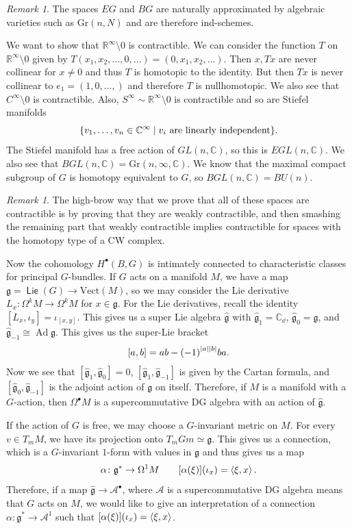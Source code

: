 \documentclass[leqno, openany]{memoir}
\theoremstyle{definition}
\theoremstyle{remark}
\newtheorem{rmk}[thm]{Remark}
\theoremstyle{plain}
\theoremstyle{definition}
\theoremstyle{remark}
\newcommand{\R}{\mathbb{R}}
\newcommand{\C}{\mathbb{C}}
\newcommand{\mc}[1]{\mathcal{#1}}
\newcommand{\mf}[1]{\mathfrak{#1}}
\newcommand{\mr}[1]{\mathrm{#1}}
\newcommand{\wh}[1]{\widehat{#1}}
\DeclareMathOperator{\Ad}{Ad}
\DeclareMathOperator{\Lie}{\mathsf{Lie}}
\begin{document}
\begin{rmk}
    The spaces $EG$ and $BG$ are naturally approximated by algebraic varieties such as $\mr{Gr}(n, N)$ and are therefore ind-schemes.
\end{rmk}

We want to show that $\R^{\infty} \setminus 0$ is contractible. We can consider the function $T$ on $\R^{\infty} \setminus 0$ given by $T(x_1, x_2, \ldots, 0, \ldots) = (0, x_1, x_2, \ldots)$. Then $x, Tx$ are never collinear for $x \neq 0$ and thus $T$ is homotopic to the identity. But then $Tx$ is never collinear to $e_1 = (1, 0, \ldots,)$ and therefore $T$ is nullhomotopic. We also see that $C^{\infty} \setminus 0$ is contractible. Also, $S^{\infty} \sim \R^{\infty} \setminus 0$ is contractible and so are Stiefel manifolds
\[ \qty{v_1, \ldots, v_n \in \C^{\infty} \mid v_i\ \text{are linearly independent}}. \]
The Stiefel manifold has a free action of $GL(n, \C)$, so this is $EGL(n, \C)$. We also see that $BGL(n, \C) = \mr{Gr}(n, \infty, \C)$. We know that the maximal compact subgroup of $G$ is homotopy equivalent to $G$, so $BGL(n, \C) = BU(n)$.

\begin{rmk}
    The high-brow way that we prove that all of these spaces are contractible is by proving that they are weakly contractible, and then smashing the remaining part that weakly contractible implies contractible for spaces with the homotopy type of a CW complex.
\end{rmk}

Now the cohomology $H^{\bullet}(B, G)$ is intimately connected to characteristic classes for principal $G$-bundles. If $G$ acts on a manifold $M$, we have a map $\mf{g} = \Lie(G) \to \mr{Vect}(M)$, so we may consider the Lie derivative $L_x \colon \Omega^k M \to \Omega^k M$ for $x \in \mf{g}$. For the Lie derivatives, recall the identity $[L_x, \iota_y] = \iota_{[x,y]}$. This gives us a super Lie algebra $\wh{\mf{g}}$ with $\wh{\mf{g}}_1 = \C_{\dd}$, $\wh{\mf{g}}_0 = \mf{g}$, and $\wh{\mf{g}}_{-1} \cong \Ad \mf{g}$. This gives us the super-Lie bracket
\[ [a,b] = ab - {(-1)}^{\abs{a} \abs{b}} ba. \]
Now we see that $[\wh{\mf{g}}_1, \wh{\mf{g}}_0] = 0$, $[\wh{\mf{g}}_1, \wh{\mf{g}}_{-1}]$ is given by the Cartan formula, and $[\wh{\mf{g}}_0, \wh{\mf{g}}_{-1}]$ is the adjoint action of $\mf{g}$ on itself. Therefore, if $M$ is a manifold with a $G$-action, then $\Omega^{\bullet} M$ is a supercommutative DG algebra with an action of $\wh{\mf{g}}$.

If the action of $G$ is free, we may choose a $G$-invariant metric on $M$. For every $v \in T_m M$, we have its projection onto $T_m Gm \simeq \mf{g}$. This gives us a connection, which is a $G$-invariant $1$-form with values in $\mf{g}$ and thus gives us a map 
\[ \alpha \colon \mf{g}^* \to \Omega^1 M \qquad [\alpha(\xi)] (\iota_x) = \ev{\xi, x}. \]
Therefore, if a map $\wh{\mf{g}} \to \mc{A}^{\bullet}$, where $\mc{A}$ is a supercommutative DG algebra means that $G$ acts on $M$, we would like to give an interpretation of a connection $\alpha \colon \mf{g}^* \to \mc{A}^1$ such that $[\alpha(\xi)] (\iota_x) = \ev{\xi, x}$.
\end{document}
